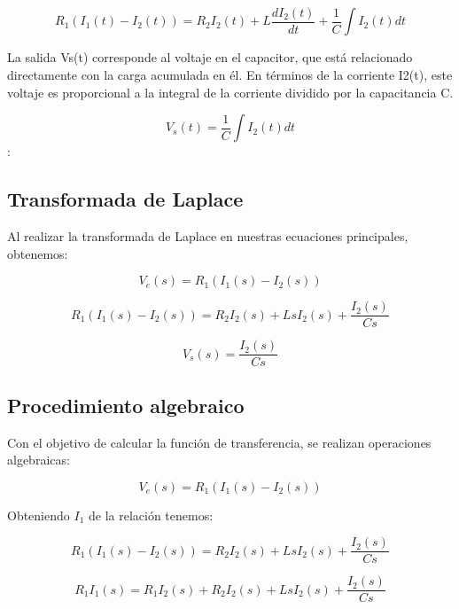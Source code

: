 \documentclass[letterpaper,11pt]{article}
\begin{document}
\begin{equation*}
R_{1}(I_{1}(t)-I_{2}(t))=R_{2}I_{2}(t)+L\frac{dI_{2}(t)}{dt}+\frac{1}{C}\int
I_{2}(t)dt
\end{equation*}

La salida Vs(t) corresponde al voltaje en el capacitor, que est\'{a}
relacionado directamente con la carga acumulada en \'{e}l. En t\'{e}rminos
de la corriente I2(t), este voltaje es proporcional a la integral de la
corriente dividido por la capacitancia C.

\begin{equation*}
V_{s}(t)=\frac{1}{C}\int I_{2}(t)dt
\end{equation*}%
:

\subsection{Transformada de Laplace}

Al realizar la transformada de Laplace en nuestras ecuaciones principales,
obtenemos:

\begin{equation*}
V_{e}(s)=R_{1}(I_{1}(s)-I_{2}(s))
\end{equation*}

\begin{equation*}
R_{1}(I_{1}(s)-I_{2}(s))=R_{2}I_{2}(s)+LsI_{2}(s)+\frac{I_{2}(s)}{Cs}
\end{equation*}

\begin{equation*}
V_{s}(s)=\frac{I_{2}(s)}{Cs}
\end{equation*}

\subsection{Procedimiento algebraico}

Con el objetivo de calcular la funci\'{o}n de transferencia, se realizan
operaciones algebraicas:

\begin{equation*}
V_{e}(s)=R_{1}(I_{1}(s)-I_{2}(s))
\end{equation*}

\bigskip Obteniendo $I_{1}$ de la relaci\'{o}n tenemos:

\begin{equation*}
R_{1}(I_{1}(s)-I_{2}(s))=R_{2}I_{2}(s)+LsI_{2}(s)+\frac{I_{2}(s)}{Cs}
\end{equation*}

\begin{equation*}
R_{1}I_{1}(s)=R_{1}I_{2}(s)+R_{2}I_{2}(s)+LsI_{2}(s)+\frac{I_{2}(s)}{Cs}
\end{equation*}
\end{document}

